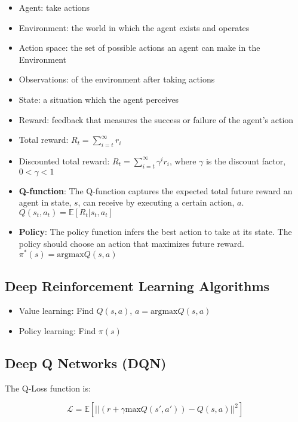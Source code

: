\documentclass[12pt, a4paper, oneside]{article}
\begin{document}
\begin{itemize}
    \item Agent: take actions
    \item Environment: the world in which the agent exists and operates
    \item Action space: the set of possible actions an agent can make in the Environment
    \item Observations: of the environment after taking actions
    \item State: a situation which the agent perceives
    \item Reward: feedback that measures the success or failure of the agent's action
    \item Total reward: $R_{t}=\sum_{i=t}^{\infty}r_{i}$
    \item Discounted total reward: $R_{t}=\sum_{i=t}^{\infty}\gamma^{i}r_{i}$, where $\gamma$ is the discount factor, $0<\gamma <1$
    \item \textbf{Q-function}: The Q-function captures the expected total future reward an agent in state, $s$, can receive by executing a certain action, $a$. $Q(s_{t},a_{t})=\mathbb{E}[R_{t}|s_{t},a_{t}]$
    \item \textbf{Policy}: The policy function infers the best action to take at its state. The policy should choose an action that maximizes future reward. $\pi^{*}(s)=\text{argmax}Q(s,a)$
\end{itemize}

\subsection{Deep Reinforcement Learning Algorithms}

\begin{itemize}
    \item Value learning: Find $Q(s,a)$, $a=\text{argmax}Q(s,a)$
    \item Policy learning: Find $\pi (s)$
\end{itemize}

\subsection{Deep Q Networks (DQN)}

The Q-Loss function is:

\begin{equation*}
    \mathcal{L}=\mathbb{E}[||(r+\gamma\text{max}Q(s',a'))-Q(s,a)||^{2}]
\end{equation*}
\end{document}
